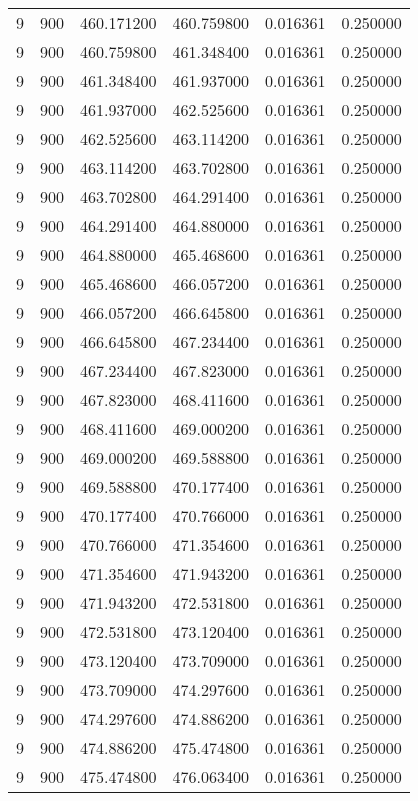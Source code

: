 \begin{longtable}{rrrrrr}
9 & 900 & 460.171200 & 460.759800 & 0.016361 & 0.250000 \\
9 & 900 & 460.759800 & 461.348400 & 0.016361 & 0.250000 \\
9 & 900 & 461.348400 & 461.937000 & 0.016361 & 0.250000 \\
9 & 900 & 461.937000 & 462.525600 & 0.016361 & 0.250000 \\
9 & 900 & 462.525600 & 463.114200 & 0.016361 & 0.250000 \\
9 & 900 & 463.114200 & 463.702800 & 0.016361 & 0.250000 \\
9 & 900 & 463.702800 & 464.291400 & 0.016361 & 0.250000 \\
9 & 900 & 464.291400 & 464.880000 & 0.016361 & 0.250000 \\
9 & 900 & 464.880000 & 465.468600 & 0.016361 & 0.250000 \\
9 & 900 & 465.468600 & 466.057200 & 0.016361 & 0.250000 \\
9 & 900 & 466.057200 & 466.645800 & 0.016361 & 0.250000 \\
9 & 900 & 466.645800 & 467.234400 & 0.016361 & 0.250000 \\
9 & 900 & 467.234400 & 467.823000 & 0.016361 & 0.250000 \\
9 & 900 & 467.823000 & 468.411600 & 0.016361 & 0.250000 \\
9 & 900 & 468.411600 & 469.000200 & 0.016361 & 0.250000 \\
9 & 900 & 469.000200 & 469.588800 & 0.016361 & 0.250000 \\
9 & 900 & 469.588800 & 470.177400 & 0.016361 & 0.250000 \\
9 & 900 & 470.177400 & 470.766000 & 0.016361 & 0.250000 \\
9 & 900 & 470.766000 & 471.354600 & 0.016361 & 0.250000 \\
9 & 900 & 471.354600 & 471.943200 & 0.016361 & 0.250000 \\
9 & 900 & 471.943200 & 472.531800 & 0.016361 & 0.250000 \\
9 & 900 & 472.531800 & 473.120400 & 0.016361 & 0.250000 \\
9 & 900 & 473.120400 & 473.709000 & 0.016361 & 0.250000 \\
9 & 900 & 473.709000 & 474.297600 & 0.016361 & 0.250000 \\
9 & 900 & 474.297600 & 474.886200 & 0.016361 & 0.250000 \\
9 & 900 & 474.886200 & 475.474800 & 0.016361 & 0.250000 \\
9 & 900 & 475.474800 & 476.063400 & 0.016361 & 0.250000 \\

\end{longtable}
